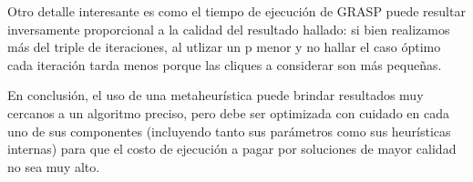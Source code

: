 Otro detalle interesante es como el tiempo de ejecución de GRASP puede resultar inversamente proporcional a la calidad del resultado hallado: si bien realizamos más del triple de iteraciones, al utlizar un p menor y no hallar el caso óptimo cada iteración tarda menos porque las cliques a considerar son más pequeñas.

En conclusión, el uso de una metaheurística puede brindar resultados muy cercanos a un algoritmo preciso, pero debe ser optimizada con cuidado en cada uno de sus componentes (incluyendo tanto sus parámetros como sus heurísticas internas) para que el costo de ejecución a pagar por soluciones de mayor calidad no sea muy alto. 